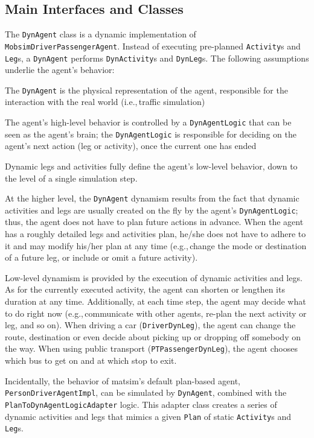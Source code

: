 \subsection{Main Interfaces and Classes}
The \lstinline$DynAgent$ class is a dynamic implementation of \lstinline$MobsimDriverPassengerAgent$. Instead of executing pre-planned \lstinline$Activity$s and \lstinline$Leg$s, a \lstinline$DynAgent$ performs \lstinline$DynActivity$s and \lstinline$DynLeg$s. The following assumptions underlie the agent's behavior:
%
\begin{compactitem}
	\item The \lstinline$DynAgent$ is the physical representation of the agent, responsible for the interaction with the real world (i.e.,\,traffic simulation)

	\item The agent's high-level behavior is controlled by a \lstinline$DynAgentLogic$ that can be seen as the agent's brain; the \lstinline$DynAgentLogic$ is responsible for deciding on the agent's next action (leg or activity), once the current one has ended
	
	\item Dynamic legs and activities fully define the agent's low-level behavior, down to the level of a single simulation step.
\end{compactitem}
%
At the higher level, the \lstinline$DynAgent$  dynamism results from the fact that dynamic activities and legs are usually created on the fly by the agent's \lstinline$DynAgentLogic$; thus, the agent does not have to plan future actions in advance. When the agent has a roughly detailed legs and activities plan, he/she does not have to adhere to it and may modify his/her plan at any time (e.g.,\,change the mode or destination of a future leg, or include or omit a future activity).

Low-level dynamism is provided by the execution of dynamic activities and legs. As for the currently executed activity, the agent can shorten or lengthen its duration at any time. Additionally, at each time step, the agent may decide what to do right now (e.g.,\,communicate with other agents, re-plan the next activity or leg, and so on). When driving a car (\lstinline$DriverDynLeg$), the agent can change the route, destination or even decide about picking up or dropping off somebody on the way. When using public transport (\lstinline$PTPassengerDynLeg$), the agent chooses which bus to get on and at which stop to exit.

Incidentally, the behavior of \gls{matsim}'s default plan-based agent, \lstinline$PersonDriverAgentImpl$, can be simulated by \lstinline$DynAgent$, combined with the \lstinline$PlanToDynAgentLogicAdapter$ logic. This adapter class creates a series of dynamic activities and legs that mimics a given \lstinline$Plan$ of static \lstinline$Activity$s and \lstinline$Leg$s.

